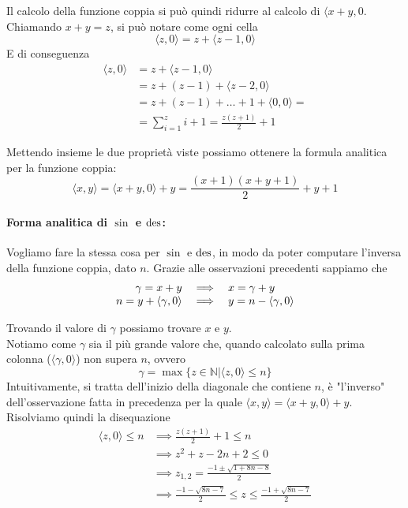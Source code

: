 Il calcolo della funzione coppia si può quindi ridurre al calcolo di $\langle x + y, 0$. Chiamando $x + y = z$, si può notare come ogni cella 
$$ \langle z,0 \rangle = z + \langle z - 1, 0 \rangle $$
E di conseguenza
\begin{align*}
	\langle z,0 \rangle & = z + \langle z - 1, 0 \rangle \\
	& = z + (z-1) + \langle z-2, 0 \rangle \\
	& = z + (z-1) + \dots + 1 + \langle 0,0 \rangle = \\
	& = \sum_{i=1}^{z} i + 1 = \frac{z(z+1)}{2} + 1
\end{align*}

Mettendo insieme le due proprietà viste possiamo ottenere la formula analitica per la funzione coppia: 
$$ \langle x,y \rangle = \langle x + y, 0 \rangle + y = \frac{(x + 1) (x + y + 1)}{2} + y + 1 $$

\paragraph{Forma analitica di $\sin$ e $\operatorname{des}$:} Vogliamo fare la stessa cosa per $\sin$ e $\operatorname{des}$, in modo da poter computare l'inversa della funzione coppia, dato $n$. Grazie alle osservazioni precedenti sappiamo che
$$ \begin{array}{r c l}
	\gamma = x + y & \implies & x = \gamma + y \\
	n = y + \langle \gamma , 0 \rangle & \implies & y = n - \langle \gamma , 0 \rangle \\
\end{array} $$

Trovando il valore di $\gamma$ possiamo trovare $x$ e $y$. \\

Notiamo come $\gamma$ sia il più grande valore che, quando calcolato sulla prima colonna ($\langle \gamma, 0 \rangle$) non supera $n$, ovvero
$$ \gamma = \max \{z \in \mathbb{N} | \langle z, 0 \rangle \leq n \} $$
Intuitivamente, si tratta dell'inizio della diagonale che contiene $n$, è "l'inverso" dell'osservazione fatta in precedenza per la quale $ \langle x,y \rangle = \langle x + y,0 \rangle + y $.\\

Risolviamo quindi la disequazione
\begin{align*}
	\langle z, 0 \rangle \leq n & \implies \frac{z(z+1)}{2} + 1 \leq n \\
	& \implies z^2 + z - 2n + 2 \leq 0 \\
	& \implies z_{1,2} = \frac{-1 \pm \sqrt{1 + 8n - 8}}{2} \\
	& \implies \frac{-1 - \sqrt{8n - 7}}{2} \leq z \leq \frac{-1 + \sqrt{8n - 7}}{2} 
\end{align*}

